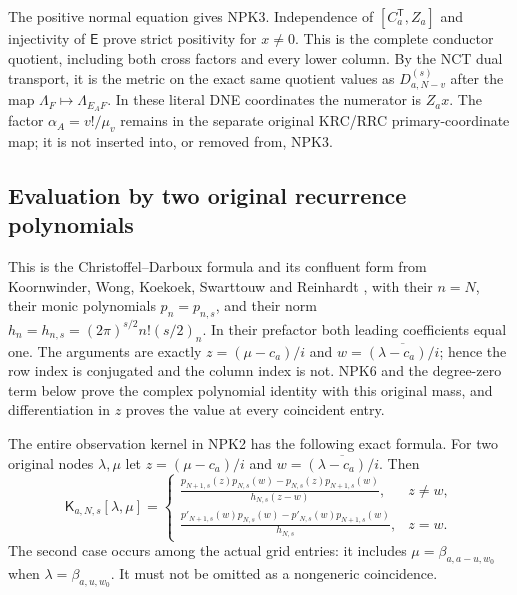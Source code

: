 \documentclass[11pt,a4paper]{article}
\begin{document}
The positive normal equation gives NPK3. Independence of
$[C_a^{\mathsf T},Z_a]$ and injectivity of $\mathsf E$ prove strict
positivity for $x\ne0$. This is the complete conductor quotient,
including both cross factors and every lower column. By the NCT
dual transport, it is the metric on the exact same quotient values
as $D_{a,N-v}^{(s)}$ after the map
$\Lambda_F\mapsto\Lambda_{E_AF}$. In these literal DNE coordinates
the numerator is $Z_ax$. The factor $\alpha_A=v!/\mu_v$ remains in
the separate original KRC/RRC primary-coordinate map; it is not
inserted into, or removed from, NPK3.

\subsection{Evaluation by two original recurrence polynomials}
This is the Christoffel--Darboux formula and its confluent form
from Koornwinder, Wong, Koekoek, Swarttouw and Reinhardt
\cite[eqs.~(18.2.12)--(18.2.13)]{human:dlmf18}, with their
$n=N$, their monic polynomials $p_n=p_{n,s}$, and their norm
$h_n=h_{n,s}=(2\pi)^{s/2}n!(s/2)_n$. In their prefactor both
leading coefficients equal one. The arguments are exactly
$z=(\mu-c_a)/i$ and $w=\overline{(\lambda-c_a)/i}$; hence the
row index is conjugated and the column index is not. NPK6 and the
degree-zero term below prove the complex polynomial identity with
this original mass, and differentiation in $z$ proves the value at
every coincident entry.

The entire observation kernel in NPK2 has the following exact formula.
For two original nodes $\lambda,\mu$ let
$z=(\mu-c_a)/i$ and $w=\overline{(\lambda-c_a)/i}$. Then
\[
 \mathsf K_{a,N,s}[\lambda,\mu]=
 \begin{cases}
 \displaystyle
 \frac{p_{N+1,s}(z)p_{N,s}(w)-p_{N,s}(z)p_{N+1,s}(w)}
      {h_{N,s}(z-w)},&z\ne w,\\[6pt]
 \displaystyle
 \frac{p'_{N+1,s}(w)p_{N,s}(w)-p'_{N,s}(w)p_{N+1,s}(w)}
      {h_{N,s}},&z=w.
 \end{cases}\tag{NPK5}
\]
The second case occurs among the actual grid entries: it includes
$\mu=\beta_{a,a-u,w_0}$ when $\lambda=\beta_{a,u,w_0}$.
It must not be omitted as a nongeneric coincidence.
\end{document}
